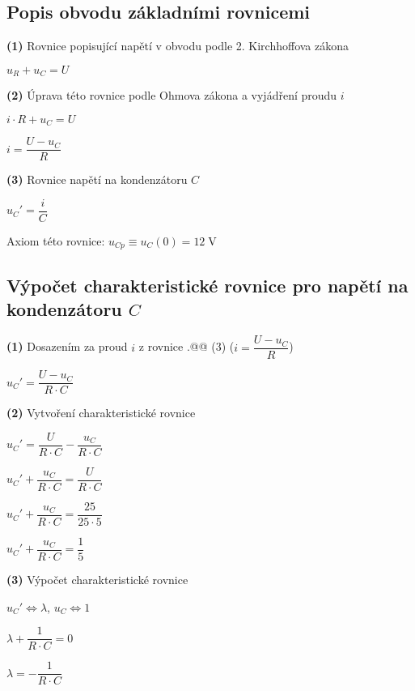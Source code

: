 \documentclass[a4paper,12pt]{article}
\makeatletter
\newcommand*{\rom}[1]{\expandafter\@slowromancap\romannumeral #1@}
\makeatother
\begin{document}
\subsection{Popis obvodu základními rovnicemi}
\hspace{1em}\textbf{(1)} Rovnice popisující napětí v obvodu podle 2. Kirchhoffova zákona\par\vspace{0.5em}$u_R+u_C=U$\par\vspace{0.1em}
\hspace{1em}\textbf{(2)} Úprava této rovnice podle Ohmova zákona a vyjádření proudu $i$\par\vspace{0.5em}
$i\cdot R+u_C=U$\par
$i=\dfrac{U-u_C}{R}$\par\vspace{1em}
\hspace{1em}\textbf{(3)} Rovnice napětí na kondenzátoru $C$\par\vspace{0.5em}
$u_C'=\dfrac{i}{C}$\par
Axiom této rovnice: $u_{Cp}\equiv u_C(0)=12\;\si{\volt}$
\subsection{Výpočet charakteristické rovnice pro napětí na kondenzátoru $C$}
\hspace{1em}\textbf{(1)} Dosazením za proud $i$ z rovnice {\rom{5.}\rom{1}} (3) ($i=\dfrac{U-u_C}{R}$)\par\vspace{0.5em}
$u_C'=\dfrac{U-u_C}{R\cdot C}$\par\vspace{1em}
\hspace{1em}\textbf{(2)} Vytvoření charakteristické rovnice\par\vspace{0.5em}
$u_C'=\dfrac{U}{R\cdot C}-\dfrac{u_C}{R\cdot C}$\par
$u_C'+\dfrac{u_C}{R\cdot C}=\dfrac{U}{R\cdot C}$\par
$u_C'+\dfrac{u_C}{R\cdot C}=\dfrac{25}{25\cdot 5}$\par
$u_C'+\dfrac{u_C}{R\cdot C}=\dfrac{1}{5}$\par\vspace{1em}
\hspace{1em}\textbf{(3)} Výpočet charakteristické rovnice\par\vspace{0.5em}
$u_C' \Leftrightarrow \lambda$, $u_C\Leftrightarrow 1$\par
$\lambda +\dfrac{1}{R\cdot C}=0$\par
$\lambda =-\dfrac{1}{R\cdot C}$\newpage
\end{document}
